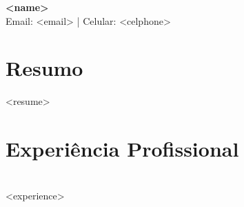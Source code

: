 \documentclass[a4paper,12pt]{article}
\begin{document}
\hypersetup{
    colorlinks=true,         %
    linkcolor=blue,          %
    filecolor=magenta,       %
    urlcolor=blue,           %
}

\begin{center}
    \LARGE{\textbf{<name>}} \\[0.5cm]
    \small{Email: <email> | Celular: <celphone> } \\
\end{center}

\section*{Resumo}
<resume>


\section*{Experiência Profissional}
\noindent\textbf{} \\
<experience> \\[0.5cm]

\end{document}
